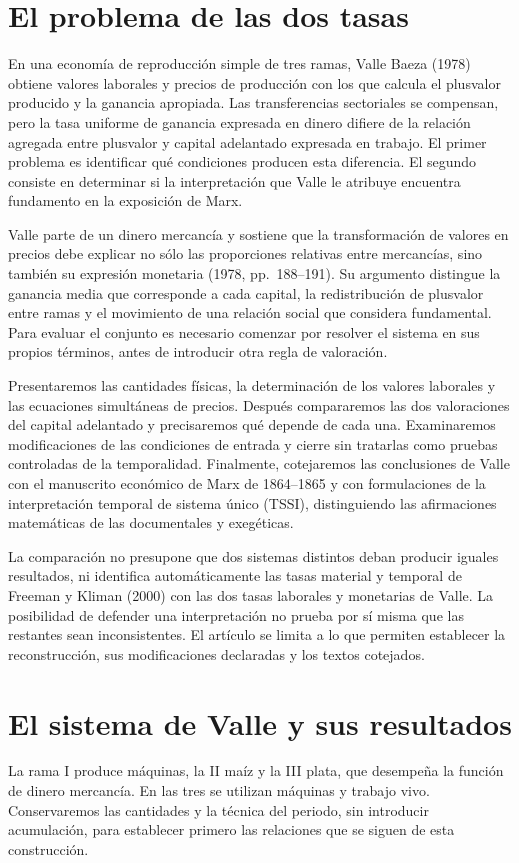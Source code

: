 \documentclass[10pt,twoside]{article}
\begin{document}
\section{El problema de las dos tasas}
En una economía de reproducción simple de tres ramas, Valle Baeza (1978) obtiene valores laborales y precios de producción con los que calcula el plusvalor producido y la ganancia apropiada. Las transferencias sectoriales se compensan, pero la tasa uniforme de ganancia expresada en dinero difiere de la relación agregada entre plusvalor y capital adelantado expresada en trabajo. El primer problema es identificar qué condiciones producen esta diferencia. El segundo consiste en determinar si la interpretación que Valle le atribuye encuentra fundamento en la exposición de Marx.

Valle parte de un dinero mercancía y sostiene que la transformación de valores en precios debe explicar no sólo las proporciones relativas entre mercancías, sino también su expresión monetaria (1978, pp.~188--191). Su argumento distingue la ganancia media que corresponde a cada capital, la redistribución de plusvalor entre ramas y el movimiento de una relación social que considera fundamental. Para evaluar el conjunto es necesario comenzar por resolver el sistema en sus propios términos, antes de introducir otra regla de valoración.

Presentaremos las cantidades físicas, la determinación de los valores laborales y las ecuaciones simultáneas de precios. Después compararemos las dos valoraciones del capital adelantado y precisaremos qué depende de cada una. Examinaremos modificaciones de las condiciones de entrada y cierre sin tratarlas como pruebas controladas de la temporalidad. Finalmente, cotejaremos las conclusiones de Valle con el manuscrito económico de Marx de 1864--1865 y con formulaciones de la interpretación temporal de sistema único (TSSI), distinguiendo las afirmaciones matemáticas de las documentales y exegéticas.

La comparación no presupone que dos sistemas distintos deban producir iguales resultados, ni identifica automáticamente las tasas material y temporal de Freeman y Kliman (2000) con las dos tasas laborales y monetarias de Valle. La posibilidad de defender una interpretación no prueba por sí misma que las restantes sean inconsistentes. El artículo se limita a lo que permiten establecer la reconstrucción, sus modificaciones declaradas y los textos cotejados.

\section{El sistema de Valle y sus resultados}
La rama I produce máquinas, la II maíz y la III plata, que desempeña la función de dinero mercancía. En las tres se utilizan máquinas y trabajo vivo. Conservaremos las cantidades y la técnica del periodo, sin introducir acumulación, para establecer primero las relaciones que se siguen de esta construcción.
\end{document}
